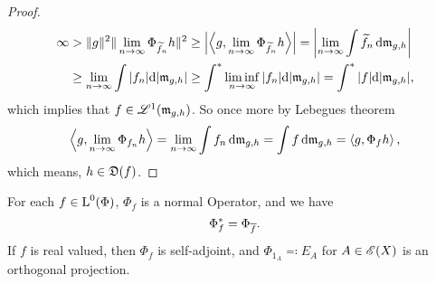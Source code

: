 \begin{proof}
 \begin{align*}
   \infty &> \|g\|^2 \| \lim_{n \to \infty} \Phi_{\widetilde{f}_n}h \|^2 \geq
   \left|\left\langle g, \lim_{n \to \infty} \Phi_{\widetilde{f}_n} h \right\rangle \right| =
   \left|\lim_{n \to \infty} \int \widetilde{f}_n \operatorname{d}\! \mathfrak{m}_{g,h} \right| \\
	  &\geq \lim_{n \to \infty} \int |f_n| \text{d}  |\mathfrak{m}_{g,h}| 
	  \geq \int ^{*} \liminf_{n \to \infty} |f_n| \text{d}  |\mathfrak{m}_{g,h}| 
	  = \int ^{*} |f| \text{d}  |\mathfrak{m}_{g,h}|,
 \end{align*}
 which implies that $f \in \mathscr{L}^1(\mathfrak{m}_{g,h})$. 
 So once more by Lebegues theorem
 \[
 \left\langle g, \lim_{n \to \infty} \Phi_{f_n} h  \right\rangle = 
 \lim_{n \to \infty} \int f_n \operatorname{d}\! \mathfrak{m}_{g,h} = \int f \operatorname{d}\! \mathfrak{m}_{g,h}
 =\left\langle g, \Phi_f h \right\rangle,
 \]
which means, $h \in \mathfrak{D}(f)$. 


\end{proof}




\begin{lem}
  \label{maintheorem3}
 For each $f \in {\text{L}^0}(\Phi)$, $\Phi_f$ is a normal Operator, and we have
\[
\Phi_f ^{*} = \Phi_{\overline{f}}. 
\]
If $f$ is real valued, then $\Phi_f$ is self-adjoint, and $\Phi_{1_A} 
\eqqcolon E_A$ for $ A \in \mathscr{E}(X)$ is an orthogonal projection. 
\end{lem}


